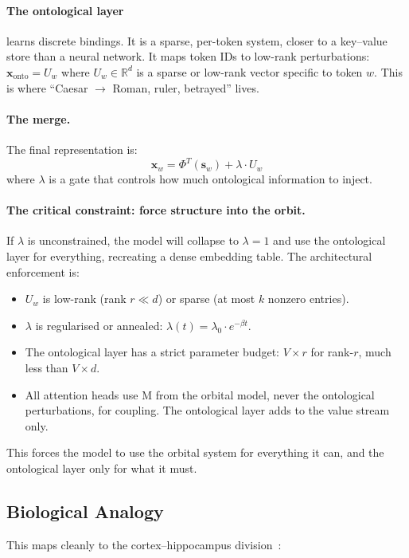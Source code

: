 \documentclass[11pt, a4paper]{article}
\newcommand{\x}{\mathbf{x}}
\newcommand{\s}{\mathbf{s}}
\newcommand{\R}{\mathbb{R}}
\theoremstyle{remark}
\begin{document}
\paragraph{The ontological layer} learns discrete bindings.
It is a sparse, per-token system, closer to a key--value store than a neural network.
It maps token IDs to low-rank perturbations: $\x_{\text{onto}} = U_w$ where $U_w \in \R^d$ is a sparse or low-rank vector specific to token $w$.
This is where ``Caesar $\to$ Roman, ruler, betrayed'' lives.

\paragraph{The merge.}
The final representation is:
\[
    \x_w = \Phi^T(\s_w) + \lambda \cdot U_w
\]
where $\lambda$ is a gate that controls how much ontological information to inject.

\paragraph{The critical constraint: force structure into the orbit.}
If $\lambda$ is unconstrained, the model will collapse to $\lambda = 1$ and use the ontological layer for everything, recreating a dense embedding table.
The architectural enforcement is:
\begin{itemize}[nosep]
    \item $U_w$ is low-rank (rank $r \ll d$) or sparse (at most $k$ nonzero entries).
    \item $\lambda$ is regularised or annealed: $\lambda(t) = \lambda_0 \cdot e^{-\beta t}$.
    \item The ontological layer has a strict parameter budget: $V \times r$ for rank-$r$, much less than $V \times d$.
    \item All attention heads use M from the orbital model, never the ontological perturbations, for coupling. The ontological layer adds to the value stream only.
\end{itemize}

This forces the model to use the orbital system for everything it can, and the ontological layer only for what it must.

\subsection{Biological Analogy}

This maps cleanly to the cortex--hippocampus division~\cite{mcclelland1995complementary}:
\end{document}

